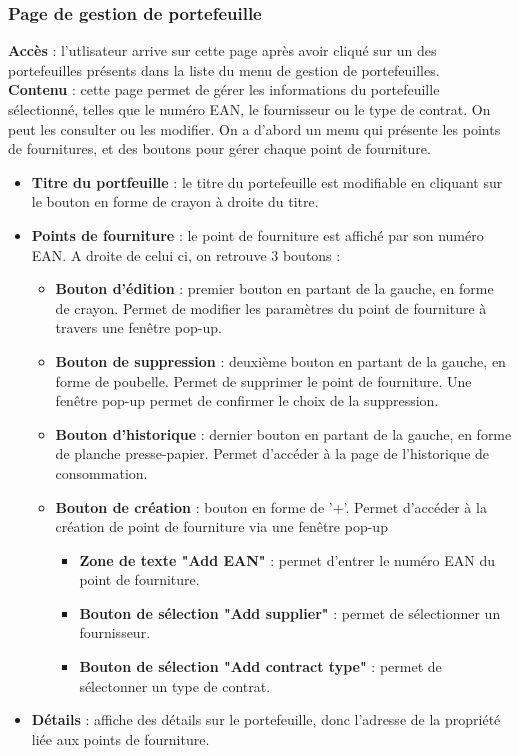 \documentclass[../rapport.tex]{subfiles}
\begin{document}
\subsubsection{Page de gestion de portefeuille}
\noindent \textbf{Accès} : l'utlisateur arrive sur cette page après avoir cliqué sur un des portefeuilles présents dans la liste du menu de gestion de portefeuilles. \\
\textbf{Contenu} : cette page permet de gérer les informations du portefeuille sélectionné, telles que le numéro EAN, le fournisseur ou le type de contrat. On peut les consulter ou les modifier. On a d'abord un menu qui présente les points de fournitures, et des boutons pour gérer chaque point de fourniture.
\begin{itemize}
    \item \textbf{Titre du portfeuille} : le titre du portefeuille est modifiable en cliquant sur le bouton en forme de crayon à droite du titre.
    \item \textbf{Points de fourniture} : le point de fourniture est affiché par son numéro EAN. A droite de celui ci, on retrouve 3 boutons :
        \begin{itemize}
            \item \textbf{Bouton d'édition} : premier bouton en partant de la gauche, en forme de crayon. Permet de modifier les paramètres du point de fourniture à travers une fenêtre pop-up. 
            \item \textbf{Bouton de suppression} : deuxième bouton en partant de la gauche, en forme de poubelle. Permet de supprimer le point de fourniture. Une fenêtre pop-up permet de confirmer le choix de la suppression.
            \item \textbf{Bouton d'historique} : dernier bouton en partant de la gauche, en forme de planche presse-papier. Permet d'accéder à la page de l'historique de consommation. 
            \item \textbf{Bouton de création} : bouton en forme de '+'. Permet d'accéder à la création de point de fourniture via une fenêtre pop-up 
                \begin{itemize}
                    \item \textbf{Zone de texte "Add EAN"} : permet d'entrer le numéro EAN du point de fourniture.
                    \item \textbf{Bouton de sélection "Add supplier"} : permet de sélectionner un fournisseur.
                    \item \textbf{Bouton de sélection "Add contract type"} : permet de sélectonner un type de contrat.
                \end{itemize}
        \end{itemize}
    \item \textbf{Détails} : affiche des détails sur le portefeuille, donc l'adresse de la propriété liée aux points de fourniture.
\end{itemize}
\end{document}
